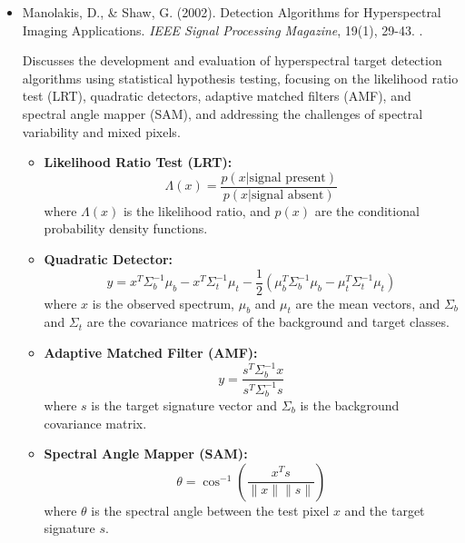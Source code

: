 \documentclass[10pt,svgnames,fragile]{beamer}
\begin{document}
\begin{frame}
\tiny
\begin{itemize}

 \item Manolakis, D., \& Shaw, G. (2002). Detection Algorithms for Hyperspectral Imaging Applications. \textit{IEEE Signal Processing Magazine}, 19(1), 29-43. \href{https://doi.org/10.1109/79.911197}{\color{blue}{DOI: 10.1109/79.911197}}. \cite{manolakisDetectionAlgorithmsHyperspectral2002}

    {\color{gray}Discusses the development and evaluation of hyperspectral target detection algorithms using statistical hypothesis testing, focusing on the likelihood ratio test (LRT), quadratic detectors, adaptive matched filters (AMF), and spectral angle mapper (SAM), and addressing the challenges of spectral variability and mixed pixels.}
    \begin{itemize} \tiny
    \item \textbf{Likelihood Ratio Test (LRT):}
    \[
    \Lambda(x) = \frac{p(x|\text{signal present})}{p(x|\text{signal absent})}
    \]
    where \(\Lambda(x)\) is the likelihood ratio, and \(p(x)\) are the conditional probability density functions.

    \item \textbf{Quadratic Detector:}
    \[
    y = x^T \Sigma_b^{-1} \mu_b - x^T \Sigma_t^{-1} \mu_t - \frac{1}{2} \left( \mu_b^T \Sigma_b^{-1} \mu_b - \mu_t^T \Sigma_t^{-1} \mu_t \right)
    \]
    where \(x\) is the observed spectrum, \(\mu_b\) and \(\mu_t\) are the mean vectors, and \(\Sigma_b\) and \(\Sigma_t\) are the covariance matrices of the background and target classes.

    \item \textbf{Adaptive Matched Filter (AMF):}
    \[
    y = \frac{s^T \Sigma_b^{-1} x}{s^T \Sigma_b^{-1} s}
    \]
    where \(s\) is the target signature vector and \(\Sigma_b\) is the background covariance matrix.

    \item \textbf{Spectral Angle Mapper (SAM):}
    \[
    \theta = \cos^{-1} \left( \frac{x^T s}{\|x\| \|s\|} \right)
    \]
    where \(\theta\) is the spectral angle between the test pixel \(x\) and the target signature \(s\).
    \end{itemize}

\end{itemize}
\end{frame}
\end{document}
